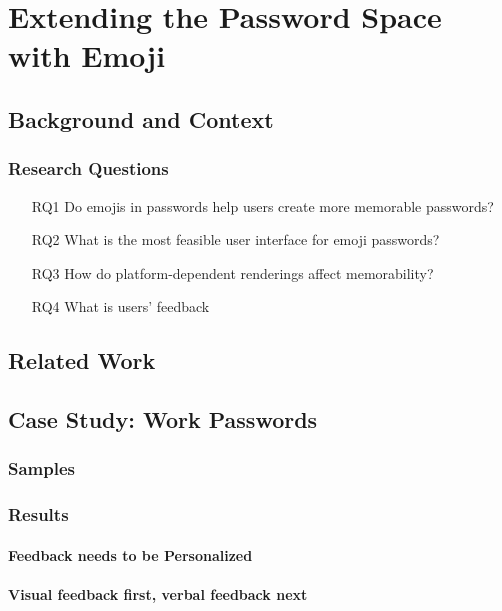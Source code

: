 \chapter[Extending the Password Space with Emoji]{Extending the Password Space with Emoji}\label{chap:emojipasswords}


\section{Background and Context}

\subsection{Research Questions}

\begin{itemize}
	\item[RQ1] Do emojis in passwords help users create more memorable passwords?
	\item[RQ2] What is the most feasible user interface for emoji passwords?
	\item[RQ3] How do platform-dependent renderings affect memorability?
	\item[RQ4] What is users' feedback 
\end{itemize}

\section{Related Work}

\section{Case Study: Work Passwords}

\subsection{Samples}
\subsection{Results}

\subsubsection{Feedback needs to be Personalized}
\subsubsection{Visual feedback first, verbal feedback next}
